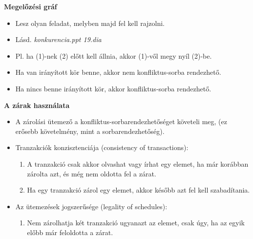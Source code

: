 \documentclass[a4paper,11.5pt, table]{article}
\begin{document}
	{\large \textbf{Megelőzési gráf}}
	\begin{itemize}
		\item Lesz olyan feladat, melyben majd fel kell rajzolni.
		\item Lásd. \textit{konkurencia.ppt 19.dia}
		\item Pl. ha (1)-nek (2) előtt kell állnia, akkor (1)-vől megy nyíl (2)-be.
		\item Ha van irányított kör benne, akkor nem konfliktus-sorba rendezhető.
		\item Ha nincs benne irányított kör, akkor konfliktus-sorba rendezhető.
	\end{itemize}

	{\large \textbf{A zárak használata}}
	\begin{itemize}
		\item A zárolási ütemező a konfliktus-sorbarendezhetőséget követeli meg, (ez erősebb követelmény, mint a sorbarendezhetőség).
		\item Tranzakciók konzisztenciája (consistency of transactions):
		\begin{enumerate}
			\item A tranzakció csak akkor olvashat vagy írhat egy elemet, ha már korábban zárolta azt, és még nem oldotta fel a zárat.
			\item Ha egy tranzakció zárol egy elemet, akkor később azt fel kell szabadítania.
		\end{enumerate}
	
		\item Az ütemezések jogszerűsége (legality of schedules): 
		\begin{enumerate}
			\item Nem zárolhatja két tranzakció ugyanazt az elemet, csak úgy, ha az egyik előbb már feloldotta a zárat. 
		\end{enumerate}
	\end{itemize}
	
\end{document}
